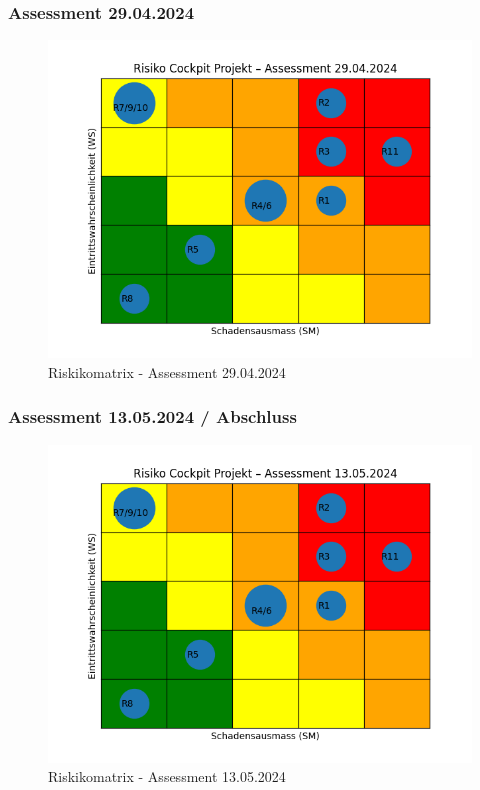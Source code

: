 \clearpage
{}
\recalctypearea
\begin{flushleft}
    \subsubsection{Assessment 29.04.2024}
    
\end{flushleft}
\clearpage
{}
\recalctypearea
\begin{flushleft}
    \begin{figure}[H]
        \centering
        \includegraphics[width=0.75\linewidth]{source/riskmatrix/project-assessment-29-04-2024}
        \caption{Riskikomatrix - Assessment 29.04.2024}
        \label{fig:project-assessment-29-04-2024}
    \end{figure}
\end{flushleft}
\clearpage
{}
\recalctypearea
\begin{flushleft}
    \subsubsection{Assessment 13.05.2024 / Abschluss}
    
\end{flushleft}
\clearpage
{}
\recalctypearea
\begin{flushleft}
    \begin{figure}[H]
        \centering
        \includegraphics[width=0.75\linewidth]{source/riskmatrix/project-assessment-13-05-2024}
        \caption{Riskikomatrix - Assessment 13.05.2024}
        \label{fig:project-assessment-13-05-2024}
    \end{figure}
\end{flushleft}
